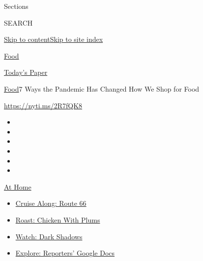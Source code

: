 Sections

SEARCH

\protect\hyperlink{site-content}{Skip to
content}\protect\hyperlink{site-index}{Skip to site index}

\href{https://www.nytimes3xbfgragh.onion/section/food}{Food}

\href{https://myaccount.nytimes3xbfgragh.onion/auth/login?response_type=cookie\&client_id=vi}{}

\href{https://www.nytimes3xbfgragh.onion/section/todayspaper}{Today's
Paper}

\href{/section/food}{Food}\textbar{}7 Ways the Pandemic Has Changed How
We Shop for Food

\url{https://nyti.ms/2R7fQK8}

\begin{itemize}
\item
\item
\item
\item
\item
\item
\end{itemize}

\href{https://www.nytimes3xbfgragh.onion/spotlight/at-home?action=click\&pgtype=Article\&state=default\&region=TOP_BANNER\&context=at_home_menu}{At
Home}

\begin{itemize}
\tightlist
\item
  \href{https://www.nytimes3xbfgragh.onion/2020/09/07/travel/route-66.html?action=click\&pgtype=Article\&state=default\&region=TOP_BANNER\&context=at_home_menu}{Cruise
  Along: Route 66}
\item
  \href{https://www.nytimes3xbfgragh.onion/2020/09/04/dining/sheet-pan-chicken.html?action=click\&pgtype=Article\&state=default\&region=TOP_BANNER\&context=at_home_menu}{Roast:
  Chicken With Plums}
\item
  \href{https://www.nytimes3xbfgragh.onion/2020/09/04/arts/television/dark-shadows-stream.html?action=click\&pgtype=Article\&state=default\&region=TOP_BANNER\&context=at_home_menu}{Watch:
  Dark Shadows}
\item
  \href{https://www.nytimes3xbfgragh.onion/interactive/2020/at-home/even-more-reporters-editors-diaries-lists-recommendations.html?action=click\&pgtype=Article\&state=default\&region=TOP_BANNER\&context=at_home_menu}{Explore:
  Reporters' Google Docs}
\end{itemize}

